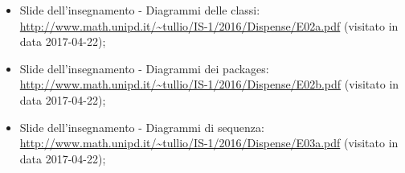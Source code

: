 \begin{itemize}
\begin{itemize}
\begin{itemize}
	       \end{itemize}
	      \end{itemize}
	    \item Slide dell’insegnamento - Diagrammi delle classi:
	    \url{http://www.math.unipd.it/~tullio/IS-1/2016/Dispense/E02a.pdf} (visitato in data 2017-04-22);
	    \item Slide dell’insegnamento - Diagrammi dei packages:
	    \url{http://www.math.unipd.it/~tullio/IS-1/2016/Dispense/E02b.pdf} (visitato in data 2017-04-22);
	    \item Slide dell’insegnamento - Diagrammi di sequenza:
	    \url{http://www.math.unipd.it/~tullio/IS-1/2016/Dispense/E03a.pdf} (visitato in data 2017-04-22);
	  \end{itemize}
